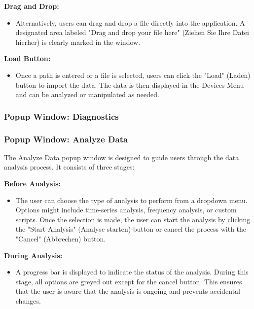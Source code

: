 \documentclass[]{scrreprt}
\begin{document}
\textbf{Drag and Drop:}
\begin{itemize}
    \item Alternatively, users can drag and drop a file directly into the application. A designated area labeled "Drag and drop your file here" (Ziehen Sie Ihre Datei hierher) is clearly marked in the window.
\end{itemize}

\textbf{Load Button:}
\begin{itemize}
    \item Once a path is entered or a file is selected, users can click the "Load" (Laden) button to import the data. The data is then displayed in the Devices Menu and can be analyzed or manipulated as needed.
\end{itemize}


\subsubsection{Popup Window: Diagnostics}

\subsubsection{Popup Window: Analyze Data}\label{cap:PopupWindow_analysedata}

The Analyze Data popup window is designed to guide users through the data analysis process. It consists of three stages:

\textbf{Before Analysis:}
\begin{itemize}
    \item The user can choose the type of analysis to perform from a dropdown menu. Options might include time-series analysis, frequency analysis, or custom scripts. Once the selection is made, the user can start the analysis by clicking the "Start Analysis" (Analyse starten) button or cancel the process with the "Cancel" (Abbrechen) button.
\end{itemize}

\textbf{During Analysis:}
\begin{itemize}
    \item A progress bar is displayed to indicate the status of the analysis. During this stage, all options are greyed out except for the cancel button. This ensures that the user is aware that the analysis is ongoing and prevents accidental changes.
\end{itemize}
\end{document}
